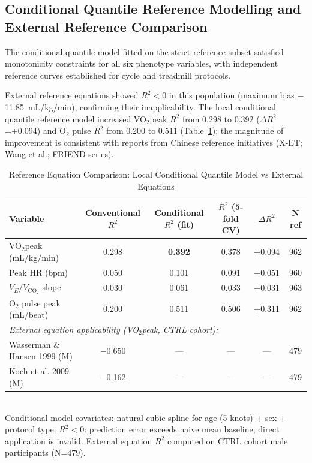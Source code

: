 \documentclass[12pt, a4paper]{article}
\begin{document}
\subsection{Conditional Quantile Reference Modelling and External Reference Comparison}

The conditional quantile model fitted on the strict reference subset satisfied
monotonicity constraints for all six phenotype variables, with independent
reference curves established for cycle and treadmill protocols.

External reference equations\cite{Wasserman1999,Koch2009} showed $R^2 < 0$
in this population (maximum bias $-$11.85~mL/kg/min), confirming their
inapplicability. The local conditional quantile reference model increased
VO$_2$peak $R^2$ from 0.298 to 0.392 ($\Delta R^2$=+0.094) and O$_2$
pulse $R^2$ from 0.200 to 0.511 (Table~\ref{tab:refequations_en});
the magnitude of improvement is consistent with reports from Chinese reference
initiatives (X-ET\cite{XET2021}; Wang et al.\cite{WangCycle2022};
FRIEND series\cite{FRIEND2022}).

\begin{table}[htbp]
\centering
\small
\caption{Reference Equation Comparison: Local Conditional Quantile Model vs External Equations}
\label{tab:refequations_en}
\begin{tabular}{lccccc}
\toprule
Variable & Conventional $R^2$ & Conditional $R^2$ (fit) & $R^2$ (5-fold CV) & $\Delta R^2$ & N ref \\
\midrule
VO$_2$peak (mL/kg/min) & 0.298 & \textbf{0.392} & 0.378 & +0.094 & 962 \\
Peak HR (bpm) & 0.050 & 0.101 & 0.091 & +0.051 & 960 \\
$V_E/V_{\text{CO}_2}$ slope & 0.030 & 0.061 & 0.033 & +0.031 & 963 \\
O$_2$ pulse peak (mL/beat) & 0.200 & 0.511 & 0.506 & +0.311 & 962 \\
\midrule
\multicolumn{6}{l}{\textit{External equation applicability (VO$_2$peak, CTRL cohort):}} \\
Wasserman \& Hansen 1999 (M) & $-$0.650 & — & — & — & 479 \\
Koch et al. 2009 (M) & $-$0.162 & — & — & — & 479 \\
\bottomrule
\end{tabular}
\\[1ex]
{\footnotesize Conditional model covariates: natural cubic spline for age (5 knots) + sex + protocol type.
$R^2<0$: prediction error exceeds naive mean baseline; direct application is invalid.
External equation $R^2$ computed on CTRL cohort male participants (N=479).}
\end{table}
\end{document}
